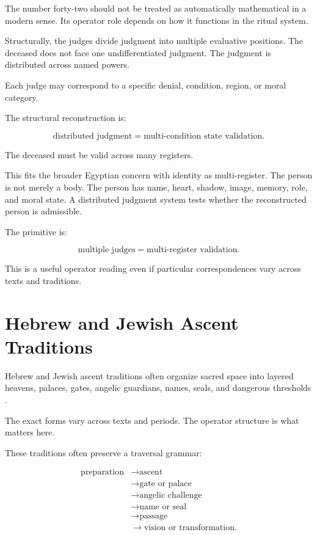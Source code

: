 \documentclass[11pt]{book}
\begin{document}
The number forty-two should not be treated as automatically mathematical in a modern sense. Its operator role depends on how it functions in the ritual system.

Structurally, the judges divide judgment into multiple evaluative positions. The deceased does not face one undifferentiated judgment. The judgment is distributed across named powers.

Each judge may correspond to a specific denial, condition, region, or moral category.

The structural reconstruction is:

\[
\text{distributed judgment} = \text{multi-condition state validation}.
\]

The deceased must be valid across many registers.

This fits the broader Egyptian concern with identity as multi-register. The person is not merely a body. The person has name, heart, shadow, image, memory, role, and moral state. A distributed judgment system tests whether the reconstructed person is admissible.

The primitive is:

\[
\text{multiple judges} = \text{multi-register validation}.
\]

This is a useful operator reading even if particular correspondences vary across texts and traditions.

\section{Hebrew and Jewish Ascent Traditions}

Hebrew and Jewish ascent traditions often organize sacred space into layered heavens, palaces, gates, angelic guardians, names, seals, and dangerous thresholds \cite{Scholem1974Kabbalah,Idel1988KabbalahNewPerspectives}.

The exact forms vary across texts and periods. The operator structure is what matters here.

These traditions often preserve a traversal grammar:

\[
\begin{aligned}
\text{preparation}
&\rightarrow
\text{ascent} \\
&\rightarrow
\text{gate or palace} \\
&\rightarrow
\text{angelic challenge} \\
&\rightarrow
\text{name or seal} \\
&\rightarrow
\text{passage} \\
&\rightarrow
\text{vision or transformation}.
\end{aligned}
\]
\end{document}
